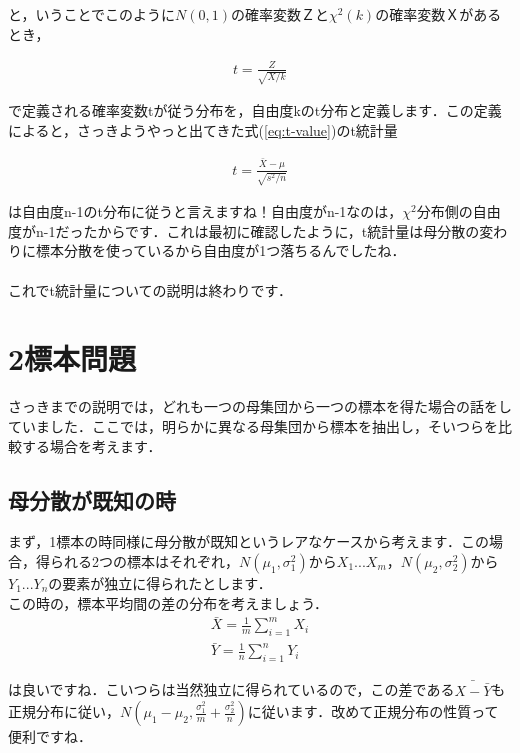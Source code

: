 \documentclass[11pt,a4paper,uplatex]{ujreport} 	%
\begin{document}
と，いうことでこのように$N(0,1)$の確率変数Ｚと$\chi^2(k)$の確率変数Ｘがあるとき，

\begin{align}
  t = \frac{Z}{\sqrt{X/k}}
\end{align}

で定義される確率変数tが従う分布を，自由度kのt分布と定義します．この定義によると，さっきようやっと出てきた式(\ref{eq:t-value})のt統計量

\begin{align}
  t = \frac{\bar{X}- \mu}{\sqrt{s^2/n}}
\end{align}

は自由度n-1のt分布に従うと言えますね！自由度がn-1なのは，$\chi^2$分布側の自由度がn-1だったからです．これは最初に確認したように，t統計量は母分散の変わりに標本分散を使っているから自由度が1つ落ちるんでしたね．\\\\

これでt統計量についての説明は終わりです．


\section{2標本問題}
さっきまでの説明では，どれも一つの母集団から一つの標本を得た場合の話をしていました．ここでは，明らかに異なる母集団から標本を抽出し，そいつらを比較する場合を考えます．

\subsection{母分散が既知の時}
まず，1標本の時同様に母分散が既知というレアなケースから考えます．この場合，得られる2つの標本はそれぞれ，$N(\mu_1, \sigma_1^2)$から$X_1...X_m$，$N(\mu_2, \sigma_2^2)$から$Y_1...Y_n$の要素が独立に得られたとします．\\

この時の，標本平均間の差の分布を考えましょう．\\

\begin{align}
  \bar{X} = \frac{1}{m}\sum_{i=1}^m X_i\\
  \bar{Y} = \frac{1}{n}\sum_{i=1}^n Y_i
\end{align}

は良いですね．こいつらは当然独立に得られているので，この差である$\bar{X-\bar{Y}}$も正規分布に従い，$N(\mu_1 - \mu_2, \frac{\sigma_1^2}{m} + \frac{\sigma_2^2}{n})$に従います．改めて正規分布の性質って便利ですね．\\
\\
\end{document}
